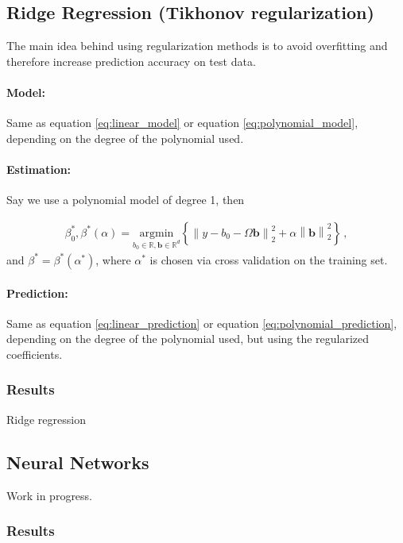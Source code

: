 \documentclass[a4paper, 12pt]{article}
\newcommand{\norm}[1]{\left\lVert#1\right\rVert}
\newcommand{\sciebopath}{/home/tm/sciebo/uni-master/master-thesis/structUncertainty/}
\begin{document}
\subsection{Ridge Regression (Tikhonov regularization)}

The main idea behind using regularization methods is to avoid overfitting and therefore increase prediction accuracy on test data.

\paragraph{Model:} Same as equation \ref{eq:linear_model} or equation \ref{eq:polynomial_model}, depending on the degree of the polynomial used.

\paragraph{Estimation:} Say we use a polynomial model of degree 1, then

\begin{align}
  \beta_0^{*}, \beta^{*}(\alpha) = \underset{b_0 \in \mathbb{R}, \bm{b} \in \mathbb{R}^d}{\text{argmin}} \left\{  \norm{y - b_0 - \Omega \bm{b}}_2^2 + \alpha \norm{\bm{b}}_2^2 \right\} \,,
\end{align}
and $\beta^* = \beta^*(\alpha^*)$, where $\alpha^*$ is chosen via cross validation on the training set.

\paragraph{Prediction:} Same as equation \ref{eq:linear_prediction} or equation \ref{eq:polynomial_prediction}, depending on the degree of the polynomial used, but using the regularized coefficients.

\subsubsection{Results}

\begin{table}[!h]
\footnotesize{

\caption{Ridge regression}
}
\end{table}

\subsection{Neural Networks}
Work in progress.

\subsubsection{Results}
\end{document}
